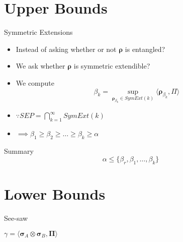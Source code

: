 \documentclass{beamer}
\begin{document}
\section{Upper Bounds}
    \begin{frame}{Symmetric Extensions}
        \begin{itemize}
            \item[] Instead of asking whether or not $\mathbf{\rho}$ is entangled?
            \item[] We ask whether $\mathbf{\rho}$ is symmetric extendible?
            \item[] We compute
            $$
                \beta_{k} = \sup\limits_{\mathbf{\rho}_{\beta_{k}} \in SymExt(k)}\langle\mathbf{\rho}_{\beta_{k}}, \Pi\rangle
            $$
            \item[] $\because SEP = \bigcap_{k=1}^{\infty}SymExt(k)$
            \item[] $\implies \beta_{1} \ge \beta_{2} \ge \dots \ge \beta_{k} \ge \alpha$
        \end{itemize}
    \end{frame}
    
    
    \begin{frame}{Summary}
        $$
             \alpha \le \{\beta_{r}, \beta_{1}, \dots, \beta_{k}\}
        $$
    \end{frame}
    
\section{Lower Bounds}
    \begin{frame}{See-saw}
        \begin{algorithm}[H]
            \KwOutput{$\gamma$}
            $\gamma = \langle\mathbf{\sigma}_{A}\otimes\mathbf{\sigma}_{B}, \mathbf{\Pi}\rangle$
            \caption{see-saw}
        \end{algorithm}
    \end{frame}
    
\end{document}
